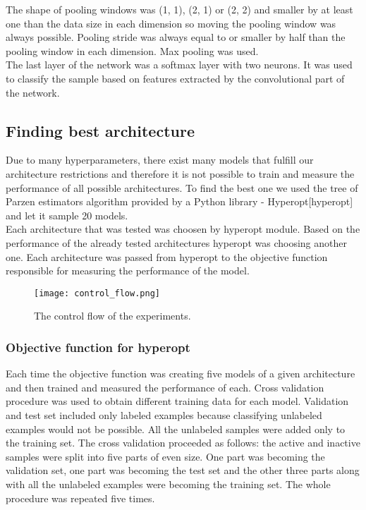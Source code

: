 \documentclass[a4paper,10pt]{report}
\begin{document}
      The shape of pooling windows was (1, 1), (2, 1) or (2, 2) and smaller by at least one than the data size in each dimension so moving the pooling window was always possible. Pooling stride was always equal to or smaller by half than the pooling window in each dimension. Max pooling was used.\\
      
      The last layer of the network was a softmax layer with two neurons. It was used to classify the sample based on features extracted by the convolutional part of the network.\\
      
	\subsection{Finding best architecture} %
	Due to many hyperparameters, there exist many models that fulfill our architecture restrictions and therefore it is not possible to train and measure the performance of all possible architectures. To find the best one we used the tree of Parzen estimators algorithm provided by a Python library - Hyperopt[hyperopt] and let it sample 20 models.\\
	
	Each architecture that was tested was choosen by hyperopt module. Based on the performance of the already tested architectures hyperopt was choosing another one. Each architecture was passed from hyperopt to the objective function responsible for measuring the performance of the model.\\
	
	 \begin{figure}[h!]
	  \centering
	  \texttt{[image: control\_flow.png]}
	  \caption{The control flow of the experiments.}
	  \label{fig:control_flow}	%
	\end{figure} 
	
	\subsubsection{Objective function for hyperopt}
	Each time the objective function was creating five models of a given architecture and then trained and measured the performance of each. Cross validation procedure was used to obtain different training data for each model. Validation and test set included only labeled examples because classifying unlabeled examples would not be possible. All the unlabeled samples were added only to the training set. The cross validation proceeded as follows: the active and inactive samples were split into five parts of even size. One part was becoming the validation set, one part was becoming the test set and the other three parts along with all the unlabeled examples were becoming the training set. The whole procedure was repeated five times.\\
	
\end{document}
